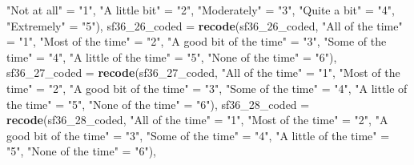 \documentclass[]{article}
\newenvironment{Shaded}{\begin{snugshade}}{\end{snugshade}}
\newcommand{\DataTypeTok}[1]{\textcolor[rgb]{0.13,0.29,0.53}{#1}}
\newcommand{\DecValTok}[1]{\textcolor[rgb]{0.00,0.00,0.81}{#1}}
\newcommand{\KeywordTok}[1]{\textcolor[rgb]{0.13,0.29,0.53}{\textbf{#1}}}
\newcommand{\NormalTok}[1]{#1}
\newcommand{\StringTok}[1]{\textcolor[rgb]{0.31,0.60,0.02}{#1}}
\begin{document}
\begin{Shaded}
\begin{Highlighting}[]
{{                         \StringTok{"Not at all"}\NormalTok{ =}\StringTok{ "1"}\NormalTok{,}
                         \StringTok{"A little bit"}\NormalTok{ =}\StringTok{ "2"}\NormalTok{,}
                         \StringTok{"Moderately"}\NormalTok{ =}\StringTok{ "3"}\NormalTok{,}
                         \StringTok{"Quite a bit"}\NormalTok{ =}\StringTok{ "4"}\NormalTok{,}
                         \StringTok{"Extremely"}\NormalTok{ =}\StringTok{ "5"}\NormalTok{),}
         \DataTypeTok{sf36_26_coded =}  \KeywordTok{recode}\NormalTok{(sf36_}\DecValTok{26}\NormalTok{_coded,}
                          \StringTok{"All of the time"}\NormalTok{ =}\StringTok{ "1"}\NormalTok{,}
                          \StringTok{"Most of the time"}\NormalTok{ =}\StringTok{ "2"}\NormalTok{,}
                          \StringTok{"A good bit of the time"}\NormalTok{ =}\StringTok{ "3"}\NormalTok{,}
                          \StringTok{"Some of the time"}\NormalTok{ =}\StringTok{ "4"}\NormalTok{,}
                          \StringTok{"A little of the time"}\NormalTok{ =}\StringTok{ "5"}\NormalTok{,}
                          \StringTok{"None of the time"}\NormalTok{ =}\StringTok{ "6"}\NormalTok{),}
         \DataTypeTok{sf36_27_coded =} \KeywordTok{recode}\NormalTok{(sf36_}\DecValTok{27}\NormalTok{_coded,}
                          \StringTok{"All of the time"}\NormalTok{ =}\StringTok{ "1"}\NormalTok{,}
                          \StringTok{"Most of the time"}\NormalTok{ =}\StringTok{ "2"}\NormalTok{,}
                          \StringTok{"A good bit of the time"}\NormalTok{ =}\StringTok{ "3"}\NormalTok{,}
                          \StringTok{"Some of the time"}\NormalTok{ =}\StringTok{ "4"}\NormalTok{,}
                          \StringTok{"A little of the time"}\NormalTok{ =}\StringTok{ "5"}\NormalTok{,}
                          \StringTok{"None of the time"}\NormalTok{ =}\StringTok{ "6"}\NormalTok{),}
         \DataTypeTok{sf36_28_coded =} \KeywordTok{recode}\NormalTok{(sf36_}\DecValTok{28}\NormalTok{_coded,}
                          \StringTok{"All of the time"}\NormalTok{ =}\StringTok{ "1"}\NormalTok{,}
                          \StringTok{"Most of the time"}\NormalTok{ =}\StringTok{ "2"}\NormalTok{,}
                          \StringTok{"A good bit of the time"}\NormalTok{ =}\StringTok{ "3"}\NormalTok{,}
                          \StringTok{"Some of the time"}\NormalTok{ =}\StringTok{ "4"}\NormalTok{,}
                          \StringTok{"A little of the time"}\NormalTok{ =}\StringTok{ "5"}\NormalTok{,}
                          \StringTok{"None of the time"}\NormalTok{ =}\StringTok{ "6"}\NormalTok{),}
}}
\end{Highlighting}
\end{Shaded}
\end{document}
